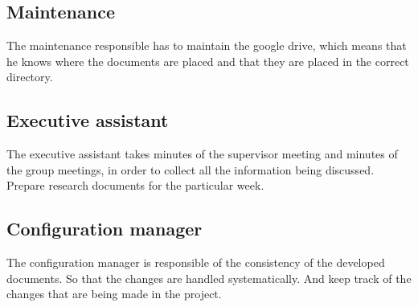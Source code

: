 \subsection*{Maintenance}
The maintenance responsible has to maintain the google drive, which means that he knows where the documents are placed and that they are placed in the correct directory.


\subsection*{Executive assistant}
The executive assistant takes minutes of the supervisor meeting and minutes of the group meetings, in order to collect all the information being discussed.
Prepare research documents for the particular week.


\subsection*{Configuration manager}
The configuration manager is responsible of the consistency of the developed documents. So that the changes are handled systematically. And keep track of the changes that are being made in the project.